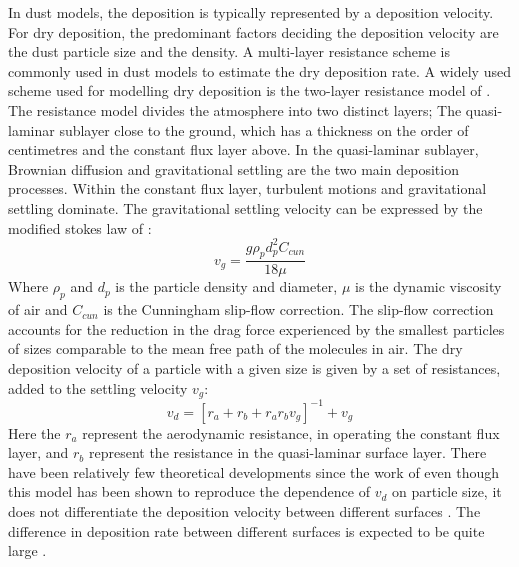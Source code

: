 In dust models, the deposition is typically represented by a deposition velocity. For dry deposition, the predominant factors deciding the deposition velocity are the dust particle size and the density. A multi-layer resistance scheme is commonly used in dust models to estimate the dry deposition rate. A widely used scheme used for modelling dry deposition is the two-layer resistance model of \parencite{slinn1982predictions}. The resistance model divides the atmosphere into two distinct layers; The quasi-laminar sublayer close to the ground, which has a thickness on the order of centimetres and the constant flux layer above. In the quasi-laminar sublayer, Brownian diffusion and gravitational settling are the two main deposition processes. Within the constant flux layer, turbulent motions and gravitational settling dominate. The gravitational settling velocity can be expressed by the modified stokes law of \parencite{slinn1982predictions}: 
\begin{equation}
    v_g = \frac{g\rho_p d_p^2 C_{cun}}{18\mu}
\end{equation}
Where $\rho_p$ and $d_p$ is the particle density and diameter, $\mu$ is the dynamic viscosity of air and $C_{cun}$ is the Cunningham slip-flow correction. The slip-flow correction accounts for the reduction in the drag force experienced by the smallest particles of sizes comparable to the mean free path of the molecules in air. The dry deposition velocity of a particle with a given size is given by a set of resistances, added to the settling velocity $v_g$:
\begin{equation}\label{eq:drydep_resistance}
    v_d=[r_a + r_b + r_a r_b v_g]^{-1} + v_g
\end{equation}
Here the $r_a$ represent the aerodynamic resistance, in operating the constant flux layer, and $r_b$ represent the resistance in the quasi-laminar surface layer. 
There have been relatively few theoretical developments since the work of \textcite{slinn1982predictions} even though this model has been shown to reproduce the dependence of $v_d$ on particle size, it does not differentiate the deposition velocity between different surfaces \parencite{shao2011dust}.
The difference in deposition rate between different surfaces is expected to be quite large \parencite{bergametti2018size}. 

